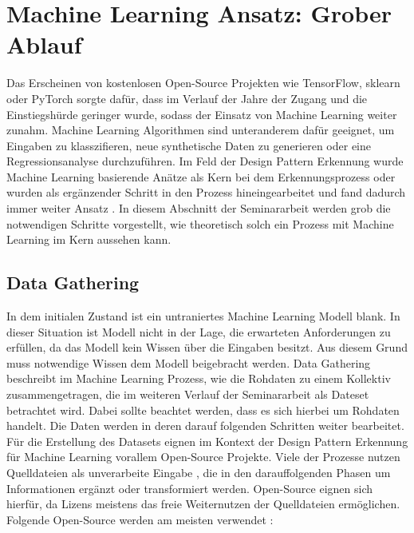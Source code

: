 \documentclass[conference]{IEEEtran}
\begin{document}

\newpage

\section{Machine Learning Ansatz: Grober Ablauf}

Das Erscheinen von kostenlosen Open-Source Projekten wie TensorFlow, sklearn oder PyTorch sorgte dafür, dass im Verlauf der Jahre der Zugang und die Einstiegshürde geringer wurde, sodass der Einsatz von Machine Learning
weiter zunahm. Machine Learning Algorithmen sind unteranderem dafür geeignet, um Eingaben zu klasszifieren, neue synthetische Daten zu generieren oder eine Regressionsanalyse durchzuführen. Im Feld der Design Pattern Erkennung wurde Machine Learning basierende Anätze als Kern bei dem Erkennungsprozess oder wurden als ergänzender Schritt in den Prozess hineingearbeitet und fand dadurch immer weiter Ansatz \cite[p. 5805]{Yarahmadi2020}.
In diesem Abschnitt der Seminararbeit werden grob die notwendigen Schritte vorgestellt, wie theoretisch solch ein Prozess mit Machine Learning im Kern aussehen kann.

\subsection{Data Gathering}
In dem initialen Zustand ist ein untraniertes Machine Learning Modell blank. In dieser Situation ist Modell nicht in der Lage, die erwarteten Anforderungen zu erfüllen, da das Modell kein Wissen über die Eingaben besitzt. Aus diesem Grund muss notwendige Wissen dem Modell beigebracht werden.
Data Gathering beschreibt im Machine Learning Prozess, wie die Rohdaten zu einem Kollektiv zusammengetragen, die im weiteren Verlauf der Seminararbeit als Dateset betrachtet wird. Dabei sollte beachtet werden, dass es sich hierbei um Rohdaten handelt. Die Daten werden in deren darauf folgenden Schritten weiter bearbeitet.
Für die Erstellung des Datasets eignen im Kontext der Design Pattern Erkennung für Machine Learning vorallem Open-Source Projekte. Viele der Prozesse nutzen Quelldateien als unverarbeite Eingabe \cite[p. 5801]{Yarahmadi2020}, die in den darauffolgenden Phasen um Informationen ergänzt oder transformiert werden. Open-Source eignen sich hierfür, da Lizens meistens das freie Weiternutzen der Quelldateien ermöglichen.
Folgende Open-Source werden am meisten verwendet \cite[p. 5817]{Yarahmadi2020}:
\end{document}
